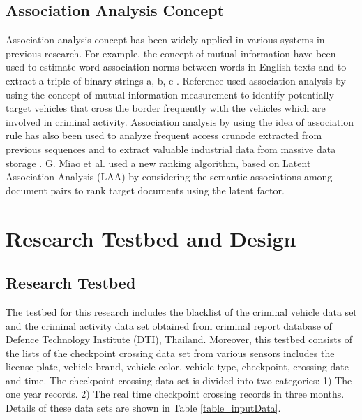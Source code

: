 \subsection{Association Analysis Concept}
\label{sec:4}
Association analysis concept has been widely applied in various systems in previous research.
For example, the concept of mutual information have been used to estimate word association norms between words in English texts \cite{chruch} and to extract a triple of binary strings a, b, c \cite{romashchenko}.
Reference \cite{kaza} used association analysis by using the concept of mutual information measurement to identify potentially target vehicles that cross the border frequently with the vehicles which are involved in criminal activity.
Association analysis by using the idea of association rule has also been used to analyze frequent access crunode extracted from previous sequences \cite{li} and to extract valuable industrial data from massive data storage \cite{zhuang}.
G. Miao et al. \cite{miao} used a new ranking algorithm, based on Latent Association Analysis (LAA) by considering
the semantic associations among document pairs to rank target documents using the latent factor.

\section{Research Testbed and Design}
\label{sec:5}

\subsection{Research Testbed}
\label{sec:6}
The testbed for this research includes the blacklist of the criminal vehicle data set and the criminal activity data set obtained from criminal report database of Defence Technology Institute (DTI), Thailand.
Moreover, this testbed consists of the lists of the checkpoint crossing data set from various sensors includes the license plate, vehicle brand, vehicle color, vehicle type, checkpoint, crossing date and time. The checkpoint crossing data set is divided into two categories: 1) The one year records. 2) The real time checkpoint crossing records in three months. Details of these data sets are shown in Table \ref{table_inputData}.

